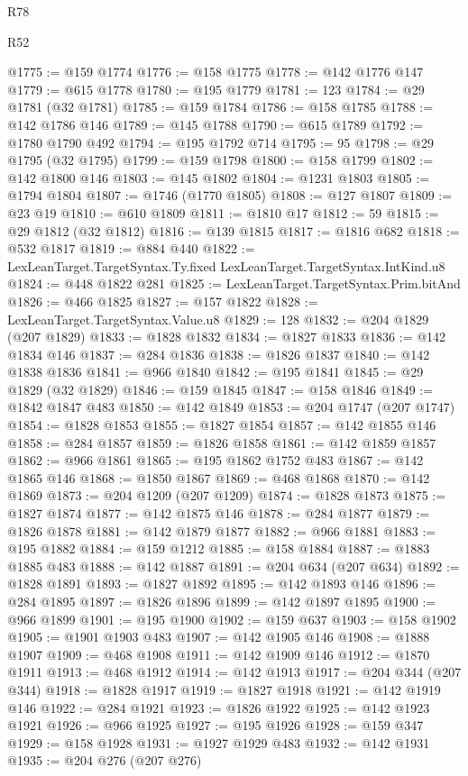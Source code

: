 \begin{lexlean}{R78}
\begin{lexlean}{R52}
\begin{coremodule}
{{{{{{{{{{{{{{{{{{{{{{{{{{{{{{{{{{{{{{{{{{{{{{{{{{{{{{{{{{{{{{{{{{{{{{{{{{{{{{{{{{{{{{{{{{{{{{{{{{{{{{{{{{{{{{{{{{{{{{{{{{{{{{{{{{{{{{{{{{{{{{{{{{{{{{{{{{{{{{{{{{{{{{{{{{{{{{{{{{{{{{{{{{{{{{{{{{{{{{@1775 := @159 @1774
@1776 := @158 @1775
@1778 := @142 @1776 @147
@1779 := @615 @1778
@1780 := @195 @1779
@1781 := 123
@1784 := @29 @1781 (@32 @1781)
@1785 := @159 @1784
@1786 := @158 @1785
@1788 := @142 @1786 @146
@1789 := @145 @1788
@1790 := @615 @1789
@1792 := @1780 @1790 @492
@1794 := @195 @1792 @714
@1795 := 95
@1798 := @29 @1795 (@32 @1795)
@1799 := @159 @1798
@1800 := @158 @1799
@1802 := @142 @1800 @146
@1803 := @145 @1802
@1804 := @1231 @1803
@1805 := @1794 @1804
@1807 := @1746 (@1770 @1805)
@1808 := @127 @1807
@1809 := @23 @19
@1810 := @610 @1809
@1811 := @1810 @17
@1812 := 59
@1815 := @29 @1812 (@32 @1812)
@1816 := @139 @1815
@1817 := @1816 @682
@1818 := @532 @1817
@1819 := @884 @440
@1822 := LexLeanTarget.TargetSyntax.Ty.fixed LexLeanTarget.TargetSyntax.IntKind.u8
@1824 := @448 @1822 @281
@1825 := LexLeanTarget.TargetSyntax.Prim.bitAnd
@1826 := @466 @1825
@1827 := @157 @1822
@1828 := LexLeanTarget.TargetSyntax.Value.u8
@1829 := 128
@1832 := @204 @1829 (@207 @1829)
@1833 := @1828 @1832
@1834 := @1827 @1833
@1836 := @142 @1834 @146
@1837 := @284 @1836
@1838 := @1826 @1837
@1840 := @142 @1838 @1836
@1841 := @966 @1840
@1842 := @195 @1841
@1845 := @29 @1829 (@32 @1829)
@1846 := @159 @1845
@1847 := @158 @1846
@1849 := @1842 @1847 @483
@1850 := @142 @1849
@1853 := @204 @1747 (@207 @1747)
@1854 := @1828 @1853
@1855 := @1827 @1854
@1857 := @142 @1855 @146
@1858 := @284 @1857
@1859 := @1826 @1858
@1861 := @142 @1859 @1857
@1862 := @966 @1861
@1865 := @195 @1862 @1752 @483
@1867 := @142 @1865 @146
@1868 := @1850 @1867
@1869 := @468 @1868
@1870 := @142 @1869
@1873 := @204 @1209 (@207 @1209)
@1874 := @1828 @1873
@1875 := @1827 @1874
@1877 := @142 @1875 @146
@1878 := @284 @1877
@1879 := @1826 @1878
@1881 := @142 @1879 @1877
@1882 := @966 @1881
@1883 := @195 @1882
@1884 := @159 @1212
@1885 := @158 @1884
@1887 := @1883 @1885 @483
@1888 := @142 @1887
@1891 := @204 @634 (@207 @634)
@1892 := @1828 @1891
@1893 := @1827 @1892
@1895 := @142 @1893 @146
@1896 := @284 @1895
@1897 := @1826 @1896
@1899 := @142 @1897 @1895
@1900 := @966 @1899
@1901 := @195 @1900
@1902 := @159 @637
@1903 := @158 @1902
@1905 := @1901 @1903 @483
@1907 := @142 @1905 @146
@1908 := @1888 @1907
@1909 := @468 @1908
@1911 := @142 @1909 @146
@1912 := @1870 @1911
@1913 := @468 @1912
@1914 := @142 @1913
@1917 := @204 @344 (@207 @344)
@1918 := @1828 @1917
@1919 := @1827 @1918
@1921 := @142 @1919 @146
@1922 := @284 @1921
@1923 := @1826 @1922
@1925 := @142 @1923 @1921
@1926 := @966 @1925
@1927 := @195 @1926
@1928 := @159 @347
@1929 := @158 @1928
@1931 := @1927 @1929 @483
@1932 := @142 @1931
@1935 := @204 @276 (@207 @276)
}}}}}}}}}}}}}}}}}}}}}}}}}}}}}}}}}}}}}}}}}}}}}}}}}}}}}}}}}}}}}}}}}}}}}}}}}}}}}}}}}}}}}}}}}}}}}}}}}}}}}}}}}}}}}}}}}}}}}}}}}}}}}}}}}}}}}}}}}}}}}}}}}}}}}}}}}}}}}}}}}}}}}}}}}}}}}}}}}}}}}}}}}}}}}}}}}}}}}}
\end{coremodule}
\end{lexlean}
\end{lexlean}
